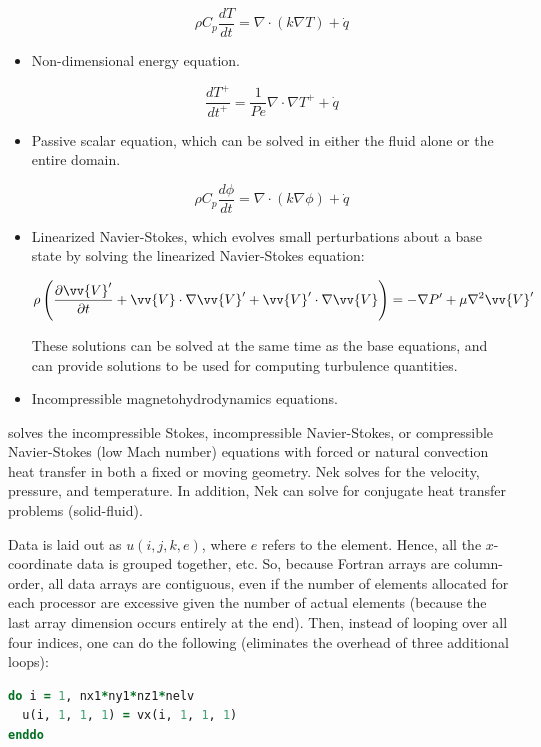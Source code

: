 \documentclass[10pt]{article}
\newcommand{\beq}{\begin{equation}}
\newcommand{\eeq}{\end{equation}}
\numberwithin{equation}{section} %
\begin{document}
\begin{itemize}
\beq
\rho C_p\frac{dT}{dt}=\nabla\cdot(k\nabla T)+\dot{q}
\eeq

\item Non-dimensional energy equation. 

\beq
\frac{dT^+}{dt^+}=\frac{1}{Pe}\nabla\cdot\nabla T^++\dot{q}
\eeq

\item Passive scalar equation, which can be solved in either the fluid alone or the entire domain.

\beq
\rho C_p\frac{d\phi}{dt}=\nabla\cdot(k\nabla\phi)+\dot{q}
\eeq

\item Linearized Navier-Stokes, which evolves small perturbations about a base state by solving the linearized Navier-Stokes equation:

\beq
\rho\left(\frac{\partial \vv{V}'}{\partial t}+\vv{V}\cdot\nabla\vv{V}'+\vv{V}'\cdot\nabla\vv{V}\right)=-\nabla P'+\mu\nabla^2\vv{V}'
\eeq

These solutions can be solved at the same time as the base equations, and can provide solutions to be used for computing turbulence quantities.

\item Incompressible magnetohydrodynamics equations.

\end{itemize}

solves the incompressible Stokes, incompressible Navier-Stokes, or compressible Navier-Stokes (low Mach number) equations with forced or natural convection heat transfer in both a fixed or moving geometry. Nek solves for the velocity, pressure, and temperature. In addition, Nek can solve for conjugate heat transfer problems (solid-fluid).

Data is laid out as \(u(i, j, k, e)\), where \(e\) refers to the element.  Hence, all the \(x\)-coordinate data is grouped together, etc. So, because Fortran arrays are column-order, all data arrays are contiguous, even if the number of elements allocated for each processor are excessive given the number of actual elements (because the last array dimension occurs entirely at the end). Then, instead of looping over all four indices, one can do the following (eliminates the overhead of three additional loops):

\begin{lstlisting}[language=Fortran]
do i = 1, nx1*ny1*nz1*nelv
  u(i, 1, 1, 1) = vx(i, 1, 1, 1)
enddo
\end{lstlisting}
\end{document}
